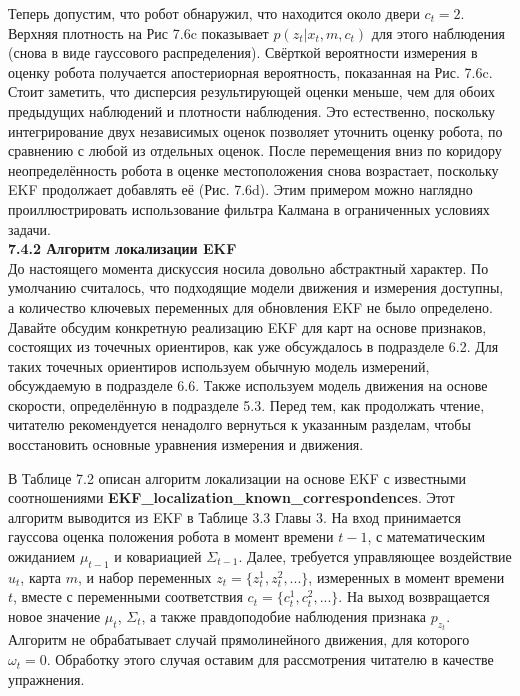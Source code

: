 \documentclass[10pt,a4paper]{article}
\begin{document}
Теперь допустим, что робот обнаружил, что находится около двери $c_t = 2$. Верхняя плотность на Рис 7.6c показывает $p(z_t | x_t, m, c_t)$ для этого наблюдения (снова в виде гауссового распределения). Свёрткой вероятности измерения в оценку робота получается апостериорная вероятность, показанная на Рис. 7.6c. Стоит заметить, что дисперсия результирующей оценки меньше, чем для обоих предыдущих наблюдений и плотности наблюдения. Это естественно, поскольку интегрирование двух независимых оценок позволяет уточнить оценку робота, по сравнению с любой из отдельных оценок. После перемещения вниз по коридору неопределённость робота в оценке местоположения снова возрастает, поскольку EKF продолжает добавлять её (Рис. 7.6d). Этим примером можно наглядно проиллюстрировать использование фильтра Калмана в ограниченных условиях задачи.\\

\textbf{7.4.2 Алгоритм локализации EKF}\\ 

До настоящего момента дискуссия носила довольно абстрактный характер. По умолчанию считалось, что подходящие модели движения и измерения доступны, а количество ключевых переменных для обновления EKF не было определено. Давайте обсудим конкретную реализацию EKF для карт на основе признаков, состоящих из точечных ориентиров, как уже обсуждалось в подразделе 6.2.
Для таких точечных ориентиров используем обычную модель измерений, обсуждаемую в подразделе 6.6. Также используем модель движения на основе скорости, определённую в подразделе 5.3. Перед тем, как продолжать чтение, читателю рекомендуется ненадолго вернуться к указанным разделам, чтобы восстановить основные уравнения измерения и движения.

В Таблице 7.2 описан алгоритм локализации на основе EKF с известными соотношениями \textbf{EKF\_localization\_known\_correspondences}. Этот алгоритм выводится из EKF в Таблице 3.3 Главы 3. На вход принимается гауссова оценка положения робота в момент времени $t - 1$, с математическим ожиданием $\mu_{t-1}$ и ковариацией $\varSigma_{t-1}$. Далее, требуется управляющее воздействие $u_t$, карта $m$, и набор переменных $z_t = \{z_t^1, z_t^2, . . .\}$, измеренных в момент времени $t$, вместе с переменными соответствия $c_t = \{c^1_t , c^2_t , . . .\}$. На выход возвращается новое значение $\mu_t$, $\varSigma_t$, а также правдоподобие наблюдения признака $p_{z_t}$. Алгоритм не обрабатывает случай прямолинейного движения, для которого $\omega_t = 0$. Обработку этого случая оставим для рассмотрения читателю в качестве упражнения.
\end{document}
